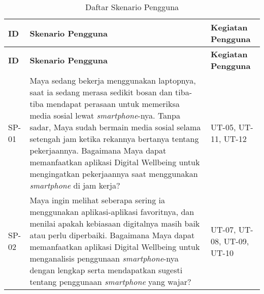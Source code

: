 
\RaggedLeft
\begin{footnotesize}
\begin{longtable}[c]{|W{c}{0.07\textwidth}|>{\ccnormspacing}m{0.6\textwidth}|>{\ccnormspacingcenter}m{0.24\textwidth}|}
  \caption{Daftar Skenario Pengguna}
  \label{tab:daftar_skenario} \\
  \hline {}
  \textbf{ID} & \centering\textbf{Skenario Pengguna} & \textbf{Kegiatan Pengguna} \\ \hline \endfirsthead
  \hline {}
  \textbf{ID} & \centering\textbf{Skenario Pengguna} & \textbf{Kegiatan Pengguna} \\ \hline \endhead

  \hline \endfoot
  
  SP-01 & Maya sedang bekerja menggunakan laptopnya, saat ia sedang merasa sedikit bosan dan tiba-tiba mendapat perasaan untuk memeriksa media sosial lewat \textit{smartphone}-nya. Tanpa sadar, Maya sudah bermain media sosial selama setengah jam ketika rekannya bertanya tentang pekerjaannya. Bagaimana Maya dapat memanfaatkan aplikasi Digital Wellbeing untuk mengingatkan pekerjaannya saat menggunakan \textit{smartphone} di jam kerja? & UT-05, UT-11, UT-12 \\ \hline
  
  SP-02 & Maya ingin melihat seberapa sering ia menggunakan aplikasi-aplikasi favoritnya, dan menilai apakah kebiasaan digitalnya masih baik atau perlu diperbaiki. Bagaimana Maya dapat memanfaatkan aplikasi Digital Wellbeing untuk menganalisis penggunaan \textit{smartphone}-nya dengan lengkap serta mendapatkan sugesti tentang penggunaan \textit{smartphone} yang wajar? & UT-07, UT-08, UT-09, UT-10 \\ \hline
  

\end{longtable}
\end{footnotesize}
